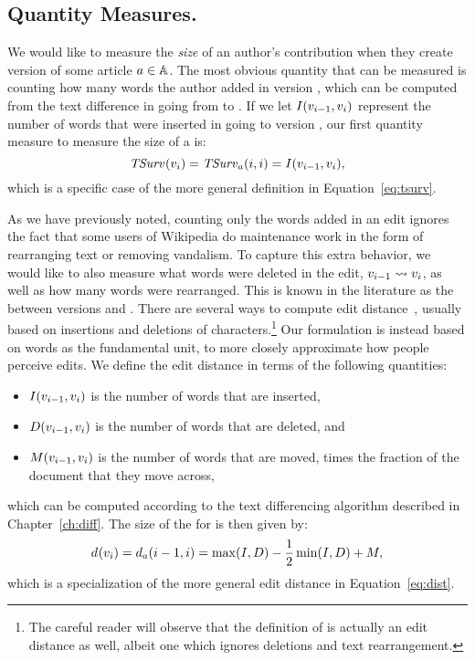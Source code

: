 \subsection{Quantity Measures.}

We would like to measure the \textit{size} of an author's contribution
when they create version  of some article $a \in \mathbb{A}$.
The most obvious quantity that can be measured is counting how
many words the author added in version ,
which can be computed from the text difference in going from
 to .
If we let $I(v_{i-1}, v_{i})$ represent the number
of words that were inserted in going to version ,
our first quantity measure to measure the size of a
 is:
\begin{equation*}
\mathit{TSurv}_{}(v_{i}) = \mathit{TSurv}_{a}(i,i) = I(v_{i-1},v_{i}),
\end{equation*}
which is a specific case of the more general
definition in Equation~\ref{eq:tsurv}.


As we have previously noted, counting only the words added in
an edit ignores the fact that some users of Wikipedia do maintenance
work in the form of rearranging text or removing vandalism.
To capture this extra behavior, we would like to also measure
what words were deleted in the edit, $v_{i-1} \rightsquigarrow v_{i}$,
as well as how many words were rearranged.
This is known in the literature as the  between
versions  and .
There are several ways to compute edit
distance~\cite{Levenshtein66,TichyEditDist},
usually based on insertions and deletions of
characters.\footnote{The careful reader will observe that
the definition of  is actually an
edit distance as well, albeit one which ignores deletions
and text rearrangement.}
Our formulation is instead based on words as the fundamental unit,
to more closely approximate how people perceive edits.
We define the edit distance in terms of the following quantities:
\begin{itemize}
\item $I(v_{i-1}, v_{i})$ is the number of words that are inserted,
\item $D(v_{i-1}, v_{i})$ is the number of words that are deleted,
    and
\item $M(v_{i-1}, v_{i})$ is the number of words that are moved,
    times the fraction of the document that they move across,
\end{itemize}
which can be computed according to the text differencing
algorithm described in Chapter~\ref{ch:diff}.
The size of the  for  is
then given by:
%
\begin{equation*}
d_{}(v_{i}) = d_{a}(i-1,i) = \max(I, D)
    - \frac{1}{2}\min(I, D) + M,
\end{equation*}
which is a specialization of the more general
edit distance in Equation~\ref{eq:dist}.



